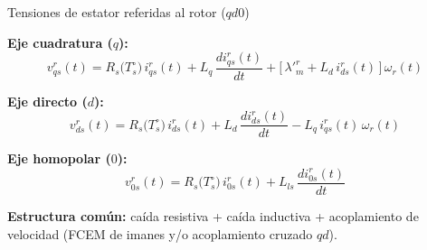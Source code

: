 \documentclass[aspectratio=169,t]{beamer}
\begin{document}
\begin{frame}{Tensiones de estator referidas al rotor ($qd0$)}
\vspace{3mm}

\textbf{Eje cuadratura ($q$):}
\begin{equation*}
v^{r}_{qs}(t) = R_s\!\big(T_s^\circ\big)\,i^{r}_{qs}(t) + L_q\,\frac{d i^{r}_{qs}(t)}{dt} + \big[\,\lambda'^r_m + L_d\,i^{r}_{ds}(t)\,\big]\,\omega_r(t)
\end{equation*}

\textbf{Eje directo ($d$):}
\begin{equation*}
v^{r}_{ds}(t) = R_s\!\big(T_s^\circ\big)\,i^{r}_{ds}(t) + L_d\,\frac{d i^{r}_{ds}(t)}{dt} - L_q\,i^{r}_{qs}(t)\,\omega_r(t)
\end{equation*}

\textbf{Eje homopolar ($0$):}
\begin{equation*}
v^{r}_{0s}(t) = R_s\!\big(T_s^\circ\big)\,i^{r}_{0s}(t) + L_{ls}\,\frac{d i^{r}_{0s}(t)}{dt}
\end{equation*}

\vspace{1mm}
{\small \textbf{Estructura común:} caída resistiva + caída inductiva + acoplamiento de velocidad (FCEM de imanes y/o acoplamiento cruzado $qd$).}
\end{frame}
\end{document}

